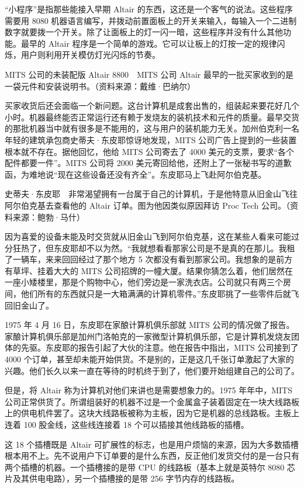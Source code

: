 \documentclass[12pt,UTF8]{ctexbook}
\begin{document}
“小程序”是指那些能接入早期 Altair 的东西，这还是一个客气的说法。这些程序需要用 8080 机器语言编写，并拨动前置面板上的开关来输入，每输入一个二进制数字就要拨一个开关。除了让面板上的灯一闪一暗，这些程序并没有什么其他功能。最早的 Altair 程序是一个简单的游戏。它可以让板上的灯按一定的规律闪烁，用户则利用开关模仿灯光闪烁的节奏。



MITS 公司的未装配版 Altair 8800　MITS 公司 Altair 最早的一批买家收到的是一袋元件和安装说明书。（资料来源：戴维·巴纳尔）

买家收货后还会面临一个新问题。这台计算机是成套出售的，组装起来要花好几个小时。机器最终能否正常运行还有赖于发烧友的装机技术和元件的质量。最早交货的那批机器当中就有很多是不能用的，这与用户的装机能力无关。加州伯克利一名年轻的建筑承包商史蒂夫·东皮耶惊讶地发现，MITS 公司广告上提到的一些装置根本就不存在。据他回忆，他给 MITS 公司寄去了 4000 美元的支票，要求“各个配件都要一件”。MITS 公司将 2000 美元寄回给他，还附上了一张秘书写的道歉函，为难地说“现在这些设备还没有齐全”。东皮耶马上飞赴阿尔伯克基。



史蒂夫·东皮耶　非常渴望拥有一台属于自己的计算机，于是他特意从旧金山飞往阿尔伯克基去查看他的 Altair 订单。图为他因类似原因拜访 Proc Tech 公司。（资料来源：鲍勃·马什）

因为喜爱的设备未能及时交货就从旧金山飞到阿尔伯克基，这在某些人看来可能过分狂热了，但东皮耶却不以为然。“我就想看看那家公司是不是真的在那儿。我租了一辆车，来来回回经过了那个地方 5 次都没有看到那家公司。我想象的是前方有草坪、挂着大大的 MITS 公司招牌的一幢大厦。结果你猜怎么着，他们居然在一座小矮楼里，那是个购物中心，他们旁边是一家洗衣店。公司就只有两三个房间，他们所有的东西就只是一大箱满满的计算机零件。”东皮耶挑了一些零件后就飞回旧金山了。

1975 年 4 月 16 日，东皮耶在家酿计算机俱乐部就 MITS 公司的情况做了报告。家酿计算机俱乐部是加州门洛帕克的一家微型计算机俱乐部，它是计算机发烧友团体的先驱。东皮耶的报告引起了大伙的注意。他在报告中指出，MITS 公司接到了 4000 个订单，甚至却未能开始供货。不是别的，正是这几千张订单激起了大家的兴趣。他们长久以来一直在等待的时机终于到了，他们要开始组建自己的公司了。

但是，将 Altair 称为计算机对他们来讲也是需要想象力的。1975 年年中，MITS 公司正常供货了。所谓组装好的机器不过是一个金属盒子装着固定在一块大线路板上的供电机件罢了。这块大线路板被称为主板，因为它是机器的总线路板。主板上连着 100 股金线，这些线连接着 18 个可以插接其他线路板的插槽。

这 18 个插槽既是 Altair 可扩展性的标志，也是用户烦恼的来源，因为大多数插槽根本用不上。先不说用户下订单要的是什么东西，反正他们发货交付的是一台只有两个插槽的机器。一个插槽接的是带 CPU 的线路板（基本上就是英特尔 8080 芯片及其供电电路），另一个插槽接的是带 256 字节内存的线路板。
\end{document}
